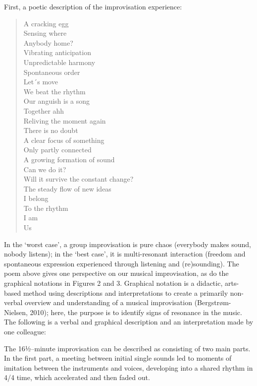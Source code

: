 \begin{adjmulticols}{2}{0mm}{0mm}
\noindent First, a poetic description of the improvisation experience:
\par
    \blockquote{A cracking egg\\
    Sensing where\\
    Anybody home?\\
    Vibrating anticipation\\
    Unpredictable harmony\\
    Spontaneous order\\
    Let´s move\\
    We beat the rhythm\\
    Our anguish is a song\\
    Together ahh\\
    Reliving the moment again\\
    There is no doubt\\
    A clear focus of something\\
    Only partly connected\\
    A growing formation of sound\\
    Can we do it?\\
    Will it survive the constant change?\\
    The steady flow of new ideas\\
    I belong\\
    To the rhythm\\
    I am\\
    Us}
\par
\noindent In the ‘worst case’, a group improvisation is pure chaos (everybody makes sound, nobody listens); in the ‘best case’, it is multi-resonant interaction (freedom and spontaneous expression experienced through listening and (re)sounding). The poem above gives one perspective on our musical improvisation, as do the graphical notations in Figures 2 and 3. Graphical notation is a didactic, arts-based method using descriptions and interpretations to create a primarily non-verbal overview and understanding of a musical improvisation (Bergstrøm-Nielsen, 2010); here, the purpose is to identify signs of resonance in the music. The following is a verbal and graphical description and an interpretation made by one colleague:

The 16½--minute improvisation can be described as consisting of two main parts. In the first part, a meeting between initial single sounds led to moments of imitation between the instruments and voices, developing into a shared rhythm in 4/4 time, which accelerated and then faded out.
    \end{adjmulticols}

